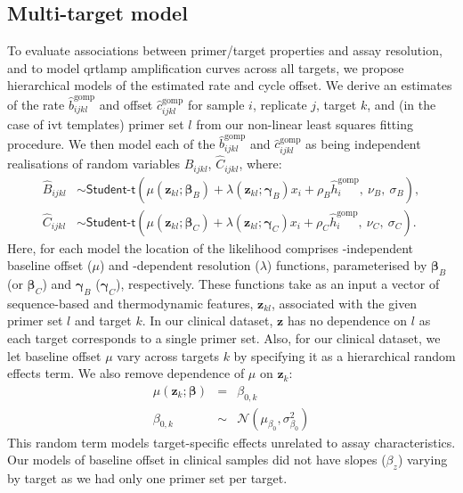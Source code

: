 \documentclass[../thesis.tex]{subfiles}
\begin{document}
\subsection{Multi-target model \label{sec:hierarchicalmodel}}
To evaluate associations between primer/target properties and assay resolution, and to model \gls{qrtlamp} amplification curves across all targets, we propose hierarchical models of the estimated rate and cycle offset. We derive an estimates of the  rate $\hat{b}^{\text{gomp}}_{ijkl}$ and offset $\hat{c}^{\text{gomp}}_{ijkl}$ for sample $i$, replicate $j$, target $k$, and (in the case of \gls{ivt}   templates) primer set $l$ from our non-linear least squares fitting procedure. We then model each of the $\hat{b}^{\text{gomp}}_{ijkl}$ and $\hat{c}^{\text{gomp}}_{ijkl}$ as being independent realisations of random variables $\hat{B}_{ijkl}$, $\hat{C}_{ijkl}$, where: 
\begin{align} 
    \hat{B}_{ijkl}  & \sim  \textsf{Student-t}(\mu(\bm{z}_{kl}; \bm{\beta}_B) + \lambda(\bm{z}_{kl}; \bm{\gamma}_B) x_i + \rho_B \hat{h}^{\text{gomp}}_{i}, \ \nu_B, \ \sigma_B), \label{eq:bhm} \\
    \hat{C}_{ijkl}  & \sim  \textsf{Student-t}(\mu(\bm{z}_{kl}; \bm{\beta}_C) + \lambda(\bm{z}_{kl}; \bm{\gamma}_C) x_i + \rho_C \hat{h}^{\text{gomp}}_{i}, \ \nu_C, \ \sigma_C). \label{eq:chm}
\end{align}
Here, for each model the location of the likelihood comprises -independent baseline offset ($\mu$) and -dependent resolution ($\lambda$) functions, parameterised by $\bm{\beta}_B$ (or $\bm{\beta}_C$) and $\bm{\gamma}_B$ ($\bm{\gamma}_C$), respectively. These functions take as an input a vector of sequence-based and thermodynamic features, $\bm{z}_{kl}$, associated with the given primer set $l$ and target $k$. In our clinical dataset, $\bm{z}$ has no dependence on $l$ as each target corresponds to a single primer set. Also, for our clinical dataset, we let baseline offset $\mu$ vary across targets $k$ by specifying it as a hierarchical random effects term. We also remove dependence of $\mu$ on $\bm{z}_{k}$:
\begin{eqnarray} \label{eq:muclin}
    \mu(\bm{z}_k; \bm{\beta}) &=& \beta_{0,k} \\
    \beta_{0,k} &\sim& \mathcal{N}(\mu_{\beta_{0}},\sigma^{2}_{\beta_{0}})
\end{eqnarray}
This random term models target-specific effects unrelated to assay characteristics. Our models of baseline offset in clinical samples did not have slopes ($\beta_{z}$) varying by target as we had only one primer set per target. 
\end{document}
